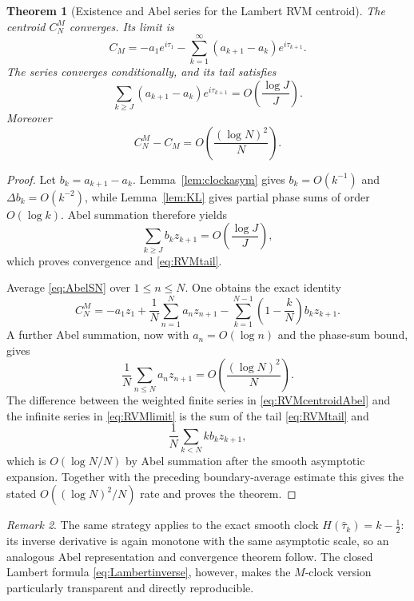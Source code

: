 \documentclass[11pt]{article}
\newtheorem{theorem}{Theorem}[section]
\theoremstyle{definition}
\theoremstyle{remark}
\newtheorem{remark}[theorem]{Remark}
\begin{document}
\begin{theorem}[Existence and Abel series for the Lambert RVM centroid]\label{thm:RVMlimit}
The centroid $C_N^M$ converges.  Its limit is
\begin{equation}\label{eq:RVMlimit}
\boxed{
C_M=-a_1e^{i\tau_1}
-\sum_{k=1}^{\infty}(a_{k+1}-a_k)e^{i\tau_{k+1}}.
}
\end{equation}
The series converges conditionally, and its tail satisfies
\begin{equation}\label{eq:RVMtail}
\sum_{k\ge J}(a_{k+1}-a_k)e^{i\tau_{k+1}}
=O\!\left(\frac{\log J}{J}\right).
\end{equation}
Moreover
\[
C_N^M-C_M=O\!\left(\frac{(\log N)^2}{N}\right).
\]
\end{theorem}
\begin{proof}
Let $b_k=a_{k+1}-a_k$.  Lemma~\ref{lem:clockasym} gives $b_k=O(k^{-1})$ and $\Delta b_k=O(k^{-2})$, while Lemma~\ref{lem:KL} gives partial phase sums of order $O(\log k)$.  Abel summation therefore yields
\[
\sum_{k\ge J}b_kz_{k+1}
=O\!\left(\frac{\log J}{J}\right),
\]
which proves convergence and \eqref{eq:RVMtail}.

Average \eqref{eq:AbelSN} over $1\le n\le N$.  One obtains the exact identity
\begin{equation}\label{eq:RVMcentroidAbel}
C_N^M
=-a_1z_1
+\frac1N\sum_{n=1}^N a_nz_{n+1}
-\sum_{k=1}^{N-1}\left(1-\frac{k}{N}\right)b_kz_{k+1}.
\end{equation}
A further Abel summation, now with $a_n=O(\log n)$ and the phase-sum bound, gives
\[
\frac1N\sum_{n\le N}a_nz_{n+1}=O\!\left(\frac{(\log N)^2}{N}\right).
\]
The difference between the weighted finite series in \eqref{eq:RVMcentroidAbel} and the infinite series in \eqref{eq:RVMlimit} is the sum of the tail \eqref{eq:RVMtail} and
\[
\frac1N\sum_{k<N}k b_kz_{k+1},
\]
which is $O(\log N/N)$ by Abel summation after the smooth asymptotic expansion.  Together with the preceding boundary-average estimate this gives the stated $O((\log N)^2/N)$ rate and proves the theorem.
\end{proof}

\begin{remark}
The same strategy applies to the exact smooth clock $H(\widehat\tau_k)=k-\tfrac12$: its inverse derivative is again monotone with the same asymptotic scale, so an analogous Abel representation and convergence theorem follow.  The closed Lambert formula \eqref{eq:Lambertinverse}, however, makes the $M$-clock version particularly transparent and directly reproducible.
\end{remark}
\end{document}
